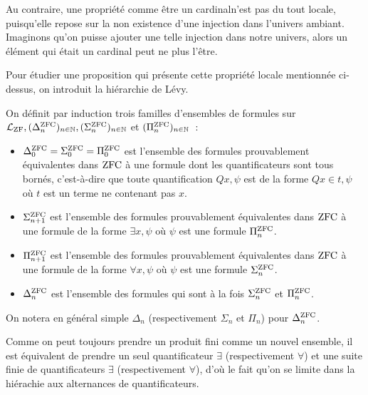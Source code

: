 Au contraire, une propriété comme \og être un cardinal\fg n'est pas du tout
locale, puisqu'elle repose sur la non existence d'une injection dans l'univers
ambiant. Imaginons qu'on puisse ajouter une telle injection dans notre univers,
alors un élément qui était un cardinal peut ne plus l'être.

Pour étudier une proposition qui présente cette propriété locale mentionnée
ci-dessus, on introduit la hiérarchie de Lévy.

\begin{definition}
  On définit par induction trois familles d'ensembles de formules sur
  $\mathcal L_{\operatorname{ZF}}, (\Delta^{\operatorname{ZFC}}_n)_{n\in\mathbb N},
  (\Sigma^{\operatorname{ZFC}}_n)_{n\in\mathbb N}$
  et $(\Pi^{\operatorname{ZFC}}_n)_{n \in \mathbb N}$~:
  \begin{itemize}
  \item $\Delta^{\operatorname{ZFC}}_0=\Sigma^{\operatorname{ZFC}}_0=\Pi^{\operatorname{ZFC}}_0$ est l'ensemble des formules
    prouvablement équivalentes dans $\operatorname{ZFC}$ à une formule dont les
    quantificateurs sont tous bornés, c'est-à-dire que toute quantification
    $Q x, \psi$ est de la forme $Q x \in t, \psi$ où $t$ est un terme ne
    contenant pas $x$.
  \item $\Sigma^{\operatorname{ZFC}}_{n+1}$ est l'ensemble des formules prouvablement
    équivalentes
    dans $\operatorname{ZFC}$ à une formule de la forme
    $\exists x, \psi$ où $\psi$ est une formule $\Pi^{\operatorname{ZFC}}_n$.
  \item $\Pi^{\operatorname{ZFC}}_{n+1}$ est l'ensemble des formules prouvablement équivalentes
    dans $\operatorname{ZFC}$ à une formule de la forme $\forall x, \psi$ où $\psi$ est une
    formule $\Sigma^{\operatorname{ZFC}}_n$.
  \item $\Delta^{\operatorname{ZFC}}_n$ est l'ensemble des formules qui sont à la fois
    $\Sigma^{\operatorname{ZFC}}_n$ et $\Pi^{\operatorname{ZFC}}_n$.
  \end{itemize}

  On notera en général simple $\Delta_n$ (respectivement $\Sigma_n$ et $\Pi_n$)
  pour $\Delta^{\operatorname{ZFC}}_n$.
\end{definition}

\begin{remark}
  Comme on peut toujours prendre un produit fini comme un nouvel ensemble, il
  est équivalent de prendre un seul quantificateur $\exists$ (respectivement
  $\forall$) et une suite finie de quantificateurs $\exists$ (respectivement
  $\forall$), d'où le fait qu'on se limite dans la hiérachie aux alternances
  de quantificateurs.
\end{remark}

